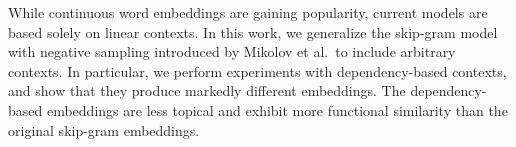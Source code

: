 While continuous word embeddings are gaining popularity, current models are based solely on linear contexts. In this work, we generalize the skip-gram model with negative sampling introduced by Mikolov et al.\ to include arbitrary contexts. In particular, we perform experiments with dependency-based contexts, and show that they produce markedly different embeddings. The dependency-based embeddings are less topical and exhibit more functional similarity than the original skip-gram embeddings.
